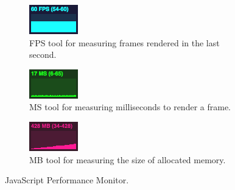 
\begin{figure}[H]
	\newcommand{\figurewidth}{0.3\textwidth}
	\begin{subfigure}[b]{\figurewidth}
        \centering
        \includegraphics{images/testing/fps}
        \caption{FPS tool for measuring frames rendered in the last second.}
        \label{fig:fps_tool}
    \end{subfigure}
    \begin{subfigure}[b]{\figurewidth}
        \centering
    	\includegraphics{images/testing/ms}
        \caption{MS tool for measuring milliseconds to render a frame.}
        \label{fig:ms_tool}
    \end{subfigure}
    \begin{subfigure}[b]{\figurewidth}
        \centering
        \includegraphics{images/testing/mb}
        \caption{MB tool for measuring the size of allocated memory.}
        \label{fig:mb_tool}
    \end{subfigure}
	\caption{JavaScript Performance Monitor.}
	\label{fig:js_performance_monitor}
\end{figure}
